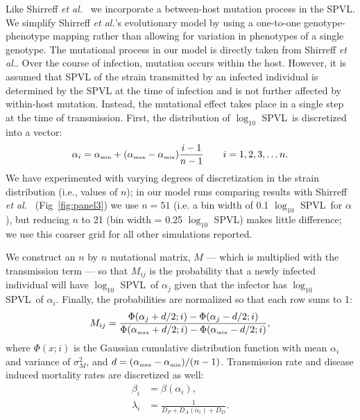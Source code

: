 \documentclass[10pt,letterpaper]{article}
\renewcommand{\figurename}{Fig}
\newcommand{\Lspvl}{$\log_{10}$ SPVL}
\newcommand{\etal}{\textit{et al.}}
\newcommand{\tsub}[2]{#1_{{\textrm{\tiny #2}}}}
\begin{document}
Like Shirreff \etal\ \cite{shirreff_transmission_2011} we incorporate a between-host mutation process in the SPVL. We simplify Shirreff \etal's evolutionary model by using a one-to-one genotype-phenotype mapping rather
than allowing for variation in phenotypes of a single genotype.
The mutational process in our model is directly taken from Shirreff \etal. Over the course of infection, mutation occurs within the host. However, it is assumed that SPVL of the strain transmitted by an infected individual is determined by the SPVL at the time of infection and is not further affected by within-host mutation. Instead, the mutational effect takes place in a single
step at the time of transmission. First, the distribution of \Lspvl\ is discretized into a vector:
\begin{equation}
\alpha_i = \tsub{\alpha}{min} + (\tsub{\alpha}{max} - \tsub{\alpha}{min})\frac{i-1}{n-1} \qquad i = 1,2,3, \dots n.
\end{equation}
We have experimented with varying degrees of discretization in the strain distribution (i.e., values of $n$); in our model runs comparing results with Shirreff \etal\ \cite{shirreff_transmission_2011} (\figurename~\ref{fig:panel3}) we use $n=51$ (i.e. a bin width of 0.1 \Lspvl\ for $\alpha$), but reducing $n$ to 21 (bin width = 0.25 \Lspvl) makes little difference; we use this coarser grid for all other simulations reported.

We construct an $n$ by $n$ mutational matrix, $M$ --- which is multiplied with the transmission term ---  so that $M_{ij}$ is the probability that a newly infected individual will have \Lspvl\ of $\alpha_j$ given that the infector has \Lspvl\ of $\alpha_i$. Finally, the probabilities are normalized so that each row sums to 1:
\begin{equation}
M_{ij} = \frac{\Phi(\alpha_j + d/2;i) - \Phi(\alpha_j - d/2;i)}{\Phi(\tsub{\alpha}{max} + d/2;i) - \Phi(\tsub{\alpha}{min} - d/2;i)},
\end{equation}
where $\Phi(x;i)$ is the Gaussian cumulative distribution function with mean $\alpha_i$ and variance of $\sigma_M^2$, and $d = (\tsub{\alpha}{max} - \tsub{\alpha}{min})/(n-1)$. Transmission rate and disease induced mortality rates are discretized as well:
\begin{equation}
\begin{aligned}
\beta_i &= \beta(\alpha_i),\\
\lambda_i &= \frac{1}{D_P + D_A (\alpha_i) + D_D}.
\end{aligned}
\end{equation}
\end{document}
